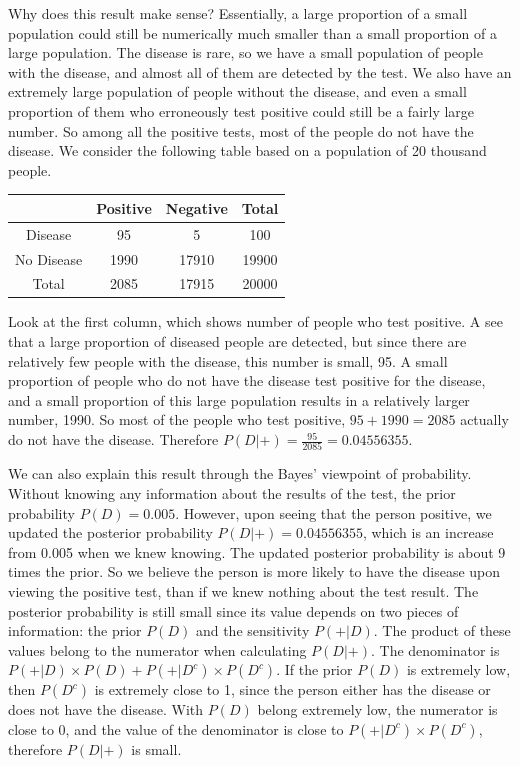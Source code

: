 \documentclass[
]{book}
\begin{document}
Why does this result make sense? Essentially, a large proportion of a small population could still be numerically much smaller than a small proportion of a large population. The disease is rare, so we have a small population of people with the disease, and almost all of them are detected by the test. We also have an extremely large population of people without the disease, and even a small proportion of them who erroneously test positive could still be a fairly large number. So among all the positive tests, most of the people do not have the disease. We consider the following table based on a population of 20 thousand people.

\begin{longtable}[]{@{}cccc@{}}
\toprule\noalign{}
& Positive & Negative & Total \\
\midrule\noalign{}
\endhead
\bottomrule\noalign{}
\endlastfoot
Disease & 95 & 5 & 100 \\
No Disease & 1990 & 17910 & 19900 \\
Total & 2085 & 17915 & 20000 \\
\end{longtable}

Look at the first column, which shows number of people who test positive. A see that a large proportion of diseased people are detected, but since there are relatively few people with the disease, this number is small, 95. A small proportion of people who do not have the disease test positive for the disease, and a small proportion of this large population results in a relatively larger number, 1990. So most of the people who test positive, \(95 + 1990 = 2085\) actually do not have the disease. Therefore \(P(D|+) = \frac{95}{2085} = 0.04556355\).

We can also explain this result through the Bayes' viewpoint of probability. Without knowing any information about the results of the test, the prior probability \(P(D) = 0.005\). However, upon seeing that the person positive, we updated the posterior probability \(P(D|+) = 0.04556355\), which is an increase from 0.005 when we knew knowing. The updated posterior probability is about 9 times the prior. So we believe the person is more likely to have the disease upon viewing the positive test, than if we knew nothing about the test result. The posterior probability is still small since its value depends on two pieces of information: the prior \(P(D)\) and the sensitivity \(P(+|D)\). The product of these values belong to the numerator when calculating \(P(D|+)\). The denominator is \(P(+|D) \times P(D) + P(+|D^c) \times P(D^c)\). If the prior \(P(D)\) is extremely low, then \(P(D^c)\) is extremely close to 1, since the person either has the disease or does not have the disease. With \(P(D)\) belong extremely low, the numerator is close to 0, and the value of the denominator is close to \(P(+|D^c) \times P(D^c)\), therefore \(P(D|+)\) is small.
\end{document}
